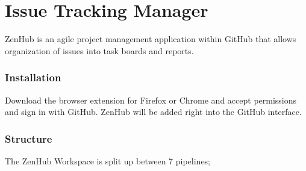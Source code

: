 \chapter{Issue Tracking Manager}

ZenHub is an agile project management application within GitHub that allows organization of issues into task boards and reports.


\subsection{Installation}
\label{\detokenize{test_plan/issue_tracking_manager:installation}}
Download the browser extension for Firefox or Chrome and accept permissions and sign in with GitHub. ZenHub will be added right into the GitHub interface.


\subsection{Structure}
\label{\detokenize{test_plan/issue_tracking_manager:structure}}
The ZenHub Workspace is split up between 7 pipelines;
